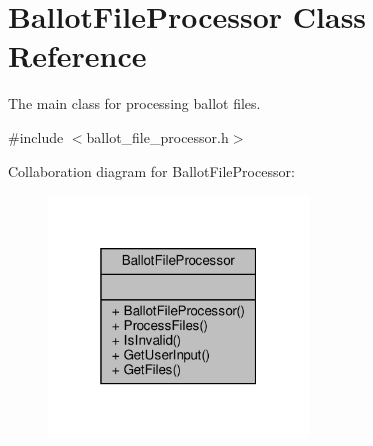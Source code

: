 \hypertarget{classBallotFileProcessor}{}\section{Ballot\+File\+Processor Class Reference}
\label{classBallotFileProcessor}


The main class for processing ballot files.  




{\ttfamily \#include $<$ballot\+\_\+file\+\_\+processor.\+h$>$}



Collaboration diagram for Ballot\+File\+Processor\+:\nopagebreak
\begin{figure}[H]
\begin{center}
\leavevmode
\includegraphics[width=196pt]{classBallotFileProcessor__coll__graph}
\end{center}
\end{figure}
